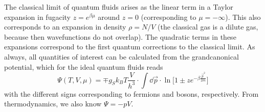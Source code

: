 The classical limit of quantum fluids arises as the 
linear term in a Taylor expansion in fugacity 
$z=e^{\beta\mu}$ around $z=0$ (corresponding to $\mu=-\infty$). 
This also corresponds to an expansion in density $\rho=N/V$
(the classical gas is a dilute gas, because then wavefunctions 
do not overlap). The quadratic terms in these expansions 
correspond to the first quantum corrections to the classical 
limit. As always, all quantities of interest can be calculated 
from the grandcanonical potential, which for the ideal quantum
fluids reads
\begin{equation}
    \Psi(T,V,\mu)=\mp g_Sk_BT\frac{V}{h^3}\cdot
    \int\dd\vec p\cdot\ln\bigg[
        1\pm ze^{-\beta\frac{\vec p^2}{2m}}
    \bigg]
    \label{eq:ideal_quantum_fluid}
\end{equation}
with the different signs corresponding to fermions and bosons, 
respectively. From thermodynamics, we also know $\Psi=-pV$.

